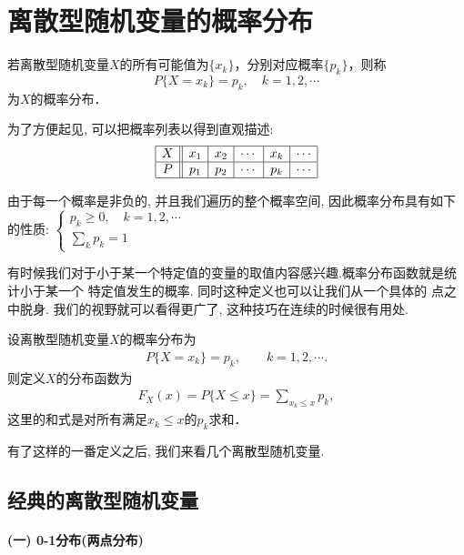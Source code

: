 \section{离散型随机变量的概率分布}

\begin{definition}[概率分布]
    若离散型随机变量$X$的所有可能值为$\{x_k\}$，分别对应概率$\{p_k\}$，则称
$$P\{X=x_k\}=p_k, \quad k=1,2,\cdots$$
为$X$的概率分布．
\end{definition}

为了方便起见, 可以把概率列表以得到直观描述: 
\[\begin{array}{|c||c|c|c|c|c|}\hline
X & x_1 & x_2 & \cdots & x_k & \cdots \\ \hline
P & p_1 & p_2 & \cdots & p_k & \cdots \\ \hline
\end{array}\]

由于每一个概率是非负的, 并且我们遍历的整个概率空间, 因此概率分布具有如下的性质:
$\displaystyle \left\{ \begin{array}{l} p_k\ge 0, \quad k=1,2,\cdots \\
\sum\limits_{k}{p_k}=1 \end{array} \right.$

有时候我们对于小于某一个特定值的变量的取值内容感兴趣.概率分布函数就是统计小于某一个
特定值发生的概率. 
 同时这种定义也可以让我们从一个具体的
点之中脱身. 我们的视野就可以看得更广了, 这种技巧在连续的时候很有用处. 

\begin{definition}[概率分布函数]
    设离散型随机变量$X$的概率分布为
    \begin{align*}
    P\{X=x_k\}=p_k,\qquad k=1,2,\cdots.
    \end{align*}
    则定义$X$的分布函数为
    \begin{align*}
    F_X(x)=P\{X\le x\}=\sum_{x_k\le x} p_k,
    \end{align*}
    这里的和式是对所有满足$x_k\le x$的$p_k$求和．
    \end{definition}

有了这样的一番定义之后, 我们来看几个离散型随机变量. 

\subsection{经典的离散型随机变量}

\paragraph{(一) 0-1分布(两点分布)}

